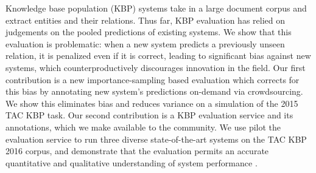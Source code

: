 Knowledge base population (KBP) systems take in a large document corpus and extract entities and their relations.
Thus far, KBP evaluation has relied on judgements on the pooled predictions of existing systems.
We show that this evaluation is problematic:
when a new system predicts a previously unseen relation, it is penalized even if it is correct,  %
leading to significant bias against new systems, which counterproductively discourages innovation in the field.
Our first contribution is a new importance-sampling based evaluation which corrects for this bias by annotating new system's predictions on-demand via crowdsourcing.
We show this eliminates bias and reduces variance on a simulation of the 2015 TAC KBP task. %
Our second contribution is a KBP evaluation service and its annotations, which we make available to the community.
We use pilot the evaluation service to run three diverse state-of-the-art systems on the TAC KBP 2016 corpus, and demonstrate that the evaluation permits
an accurate quantitative and qualitative understanding of system performance .


